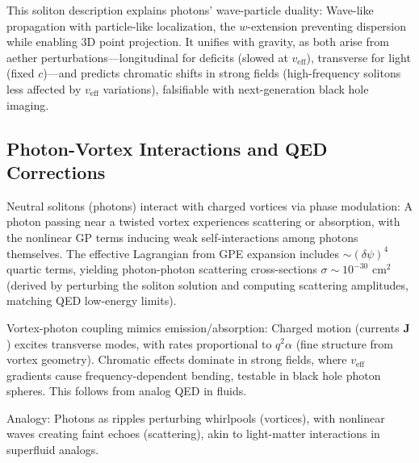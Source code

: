This soliton description explains photons' wave-particle duality: Wave-like propagation with particle-like localization, the $w$-extension preventing dispersion while enabling 3D point projection. It unifies with gravity, as both arise from aether perturbations---longitudinal for deficits (slowed at $v_{\text{eff}}$), transverse for light (fixed $c$)---and predicts chromatic shifts in strong fields (high-frequency solitons less affected by $v_{\text{eff}}$ variations), falsifiable with next-generation black hole imaging.

\medskip
\noindent
{}
\medskip

\subsection{Photon-Vortex Interactions and QED Corrections}

Neutral solitons (photons) interact with charged vortices via phase modulation: A photon passing near a twisted vortex experiences scattering or absorption, with the nonlinear GP terms inducing weak self-interactions among photons themselves. The effective Lagrangian from GPE expansion includes $\sim (\delta \psi)^4$ quartic terms, yielding photon-photon scattering cross-sections $\sigma \sim 10^{-30}$ cm$^2$ (derived by perturbing the soliton solution and computing scattering amplitudes, matching QED low-energy limits).

Vortex-photon coupling mimics emission/absorption: Charged motion (currents $\mathbf{J}$) excites transverse modes, with rates proportional to $q^2 \alpha$ (fine structure from vortex geometry). Chromatic effects dominate in strong fields, where $v_{\text{eff}}$ gradients cause frequency-dependent bending, testable in black hole photon spheres. This follows from analog QED in fluids.

Analogy: Photons as ripples perturbing whirlpools (vortices), with nonlinear waves creating faint echoes (scattering), akin to light-matter interactions in superfluid analogs.

